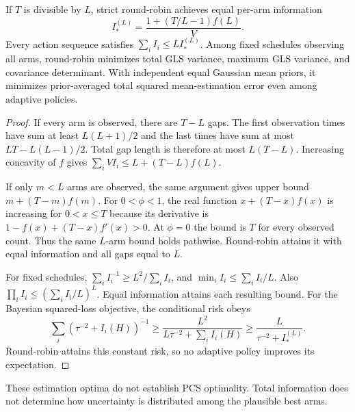 \begin{theorem}
If $T$ is divisible by $L$, strict round-robin achieves equal per-arm information
\begin{equation}
I_*^{(L)}=\frac{1+(T/L-1)f(L)}V.
\end{equation}
Every action sequence satisfies $\sum_iI_i\leq L I_*^{(L)}$. Among fixed schedules observing all arms, round-robin minimizes total GLS variance, maximum GLS variance, and covariance determinant. With independent equal Gaussian mean priors, it minimizes prior-averaged total squared mean-estimation error even among adaptive policies.
\end{theorem}
\begin{proof}
If every arm is observed, there are $T-L$ gaps. The first observation times have sum at least $L(L+1)/2$ and the last times have sum at most $LT-L(L-1)/2$. Total gap length is therefore at most $L(T-L)$. Increasing concavity of $f$ gives $\sum_iVI_i\leq L+(T-L)f(L)$.

If only $m<L$ arms are observed, the same argument gives upper bound $m+(T-m)f(m)$. For $0<\phi<1$, the real function $x+(T-x)f(x)$ is increasing for $0<x\leq T$ because its derivative is $1-f(x)+(T-x)f'(x)>0$. At $\phi=0$ the bound is $T$ for every observed count. Thus the same $L$-arm bound holds pathwise. Round-robin attains it with equal information and all gaps equal to $L$.

For fixed schedules, $\sum_iI_i^{-1}\geq L^2/\sum_iI_i$, and $\min_iI_i\leq\sum_iI_i/L$. Also $\prod_iI_i\leq(\sum_iI_i/L)^L$. Equal information attains each resulting bound. For the Bayesian squared-loss objective, the conditional risk obeys
\[
\sum_i(\tau^{-2}+I_i(H))^{-1}
\geq\frac{L^2}{L\tau^{-2}+\sum_iI_i(H)}
\geq\frac L{\tau^{-2}+I_*^{(L)}}.
\]
Round-robin attains this constant risk, so no adaptive policy improves its expectation.
\end{proof}
These estimation optima do not establish PCS optimality. Total information does not determine how uncertainty is distributed among the plausible best arms.

